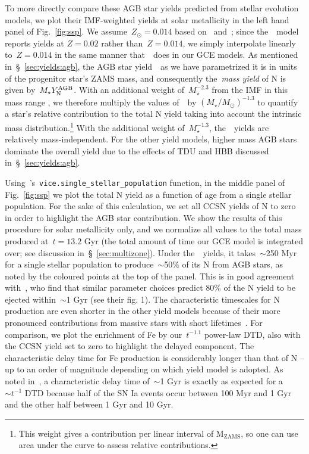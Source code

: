\documentclass[ms.tex]{subfiles}
\begin{document}
To more directly compare these AGB star yields predicted from stellar
evolution models, we plot their IMF-weighted yields at solar metallicity in the
left hand panel of Fig.~\ref{fig:ssp}.
We assume~$Z_\odot = 0.014$ based on~\citet{Asplund2009}
and~\citet*{Asplund2021}; since the~\karakasten~model reports yields at
$Z = 0.02$ rather than~$Z = 0.014$, we simply interpolate linearly
to~$Z = 0.014$ in the same manner that~\vice~does in our GCE models.
As mentioned in~\S~\ref{sec:yields:agb}, the AGB star yield~~as we
have parametrized it is in units of the progenitor star's ZAMS mass, and
consequently the~\textit{mass yield} of N is given by~$M_\star Y_\text{N}^\text{AGB}$.
With an additional weight of~$M_\star^{-2.3}$ from the IMF in this mass range
\citep[e.g.][]{Kroupa2001}, we therefore multiply the values of~~by
$(M_\star / M_\odot)^{-1.3}$ to quantify a star's relative contribution to the
total N yield taking into account the intrinsic mass distribution.\footnote{
	This weight gives a contribution per linear interval of M$_\text{ZAMS}$, so
	one can use area under the curve to assess relative contributions.
}
With the additional weight of~$M_\star^{-1.3}$, the~\cristallo~yields are
relatively mass-independent.
For the other yield models, higher mass AGB stars dominate the overall yield
due to the effects of TDU and HBB discussed in~\S~\ref{sec:yields:agb}.
\par
Using~\vice's~\texttt{vice.single\_stellar\_population} function, in the
middle panel of Fig.~\ref{fig:ssp} we plot the total N yield as a function of
age from a single stellar population.
For the sake of this calculation, we set all CCSN yields of N to zero in order
to highlight the AGB star contribution.
We show the results of this procedure for solar metallicity only, and we
normalize all values
to the total mass produced at~$t = 13.2$ Gyr (the total amount of time our GCE
model is integrated over; see discussion in~\S~\ref{sec:multizone}).
Under the~\cristallo~yields, it takes~$\sim$250 Myr for a single stellar
population to produce~$\sim$50\% of its N from AGB stars, as noted by the
coloured points at the top of the panel.
This is in good agreement with~\citet{Maiolino2019}, who find that similar
parameter choices predict 80\% of the N yield to be ejected within~$\sim$1 Gyr
(see their fig. 1).
The characteristic timescales for N production are even shorter in the other
yield models because of their more pronounced contributions from massive stars
with short lifetimes~\citep[e.g.][]{Larson1974, Maeder1989, Padovani1993}.
For comparison, we plot the enrichment of Fe by our~$t^{-1.1}$ power-law DTD,
also with the CCSN yield set to zero to highlight the delayed component.
The characteristic delay time for Fe production is considerably longer than
that of N -- up to an order of magnitude depending on which yield model is
adopted.
As noted in~\citet{Johnson2021}, a characteristic delay time of~$\sim$1 Gyr
is exactly as expected for a~$\sim t^{-1}$ DTD because half of the SN Ia
events occur between 100 Myr and 1 Gyr and the other half between 1 Gyr and
10 Gyr.
\end{document}
